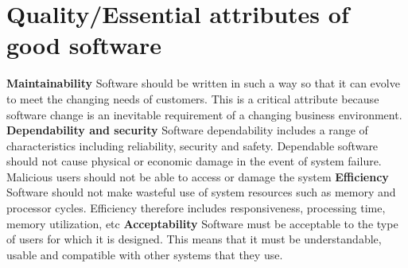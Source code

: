 \documentclass{report}
\begin{document}
\section{Quality/Essential attributes of good software}
\noindent \textbf{Maintainability}\newline
Software should be written in such a way so that it can evolve to meet the changing needs of customers. This is a critical attribute because software change is an inevitable requirement of a changing business environment.\newline
\textbf{Dependability and security}\newline
Software dependability includes a range of characteristics including reliability, security and safety. Dependable software should not cause physical or economic damage in the event of
system failure. Malicious users should not be able to access or damage the system\newline
\textbf{Efficiency}\newline
Software should not make wasteful use of system resources such as memory and processor cycles. Efficiency therefore includes responsiveness, processing time, memory utilization, etc\newline
\textbf{Acceptability}\newline
Software must be acceptable to the type of users for which it is designed. This means that it must be understandable, usable and compatible with other systems that they use.

\newpage
\end{document}
